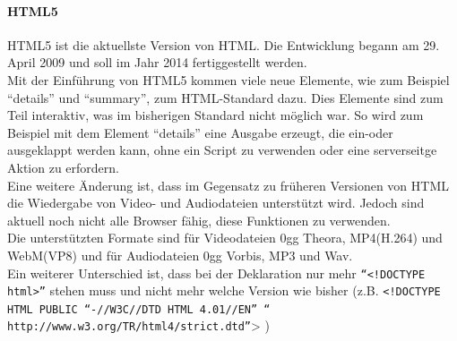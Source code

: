 \paragraph{HTML5}
HTML5 ist die aktuellste Version von HTML. Die Entwicklung begann am 29. April 2009 und soll im Jahr 2014 fertiggestellt werden.\\ 
Mit der Einführung von HTML5 kommen viele neue Elemente, wie zum Beispiel \enquote{details} und \enquote{summary}, zum HTML-Standard dazu. Dies Elemente sind zum Teil interaktiv, was im bisherigen Standard nicht möglich war. So wird zum Beispiel mit dem Element \enquote{details} eine Ausgabe erzeugt, die ein-oder ausgeklappt werden kann, ohne ein Script zu verwenden oder eine serverseitge Aktion zu erfordern.\\
Eine weitere Änderung ist, dass im Gegensatz zu früheren Versionen von HTML die Wiedergabe von Video- und Audiodateien unterstützt wird. Jedoch sind aktuell noch nicht alle Browser fähig, diese Funktionen zu verwenden.\\
Die unterstützten Formate sind für Videodateien 0gg Theora, MP4(H.264) und WebM(VP8) und für Audiodateien 0gg Vorbis, MP3 und Wav. \\
Ein weiterer Unterschied ist, dass bei der Deklaration nur mehr \texttt{\enquote{<!DOCTYPE html>}} stehen muss und nicht mehr welche Version wie bisher (z.B. \texttt{<!DOCTYPE HTML PUBLIC \enquote{-//W3C//DTD HTML 4.01//EN} \enquote{ http://www.w3.org/TR/html4/strict.dtd}}> )
\begin{description}
\item[]
\end{description}